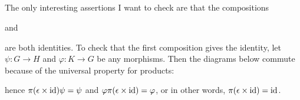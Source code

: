 \documentclass[12pt]{article}
\begin{document}
\subsection{} 
The only interesting assertions I want to check are that the compositions 
\begin{center}

  \vspace{0.5em}
  and 

  \vspace{0.5em}
\end{center}
are both identities. 
To check that the first composition gives the identity, let $\psi: G \rightarrow H$ and $\varphi: K \rightarrow G$ be any morphisms. 
Then the diagrams below commute because of the universal property for products:  
\begin{center}
  \hspace{1.5em} 
\end{center}
hence $\pi (\epsilon \times \text{id}) \psi = \psi$ and $\varphi \pi (\epsilon \times \text{id})  = \varphi$,
or in other words, $\pi (\epsilon \times \text{id}) = \text{id}$. 
\end{document}
